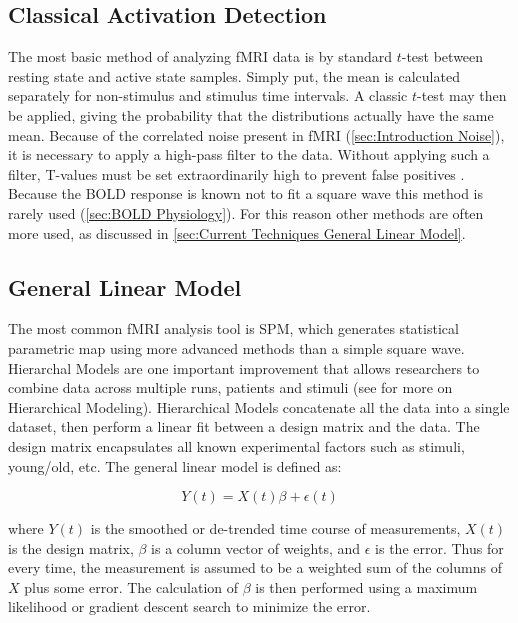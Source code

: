 \subsection{Classical Activation Detection}
\label{sec:Square Wave}
The most basic method of analyzing \ac{fMRI} data is by standard $t$-test
between resting state and active state samples. Simply put, the
mean is calculated separately for non-stimulus and stimulus time intervals.
A classic $t$-test may then be applied, giving the probability that the
distributions actually have the same mean. Because of the correlated
noise present in \ac{fMRI} (\autoref{sec:Introduction Noise}), it is necessary
to apply a high-pass filter to the data. Without applying
such a filter, T-values must be set extraordinarily high to prevent
false positives \cite{Smith2007}. Because the \ac{BOLD} response is known
not to fit a square wave this method is rarely used
(\autoref{sec:BOLD Physiology}). For this reason other methods
are often more used, as discussed in 
\autoref{sec:Current Techniques General Linear Model}.

\subsection{General Linear Model}
\label{sec:Current Techniques General Linear Model}
The most common \ac{fMRI} analysis tool is \ac{SPM}, which generates
statistical parametric map using more advanced methods than a simple
square wave. Hierarchal
Models are one important improvement that allows researchers
to combine data across multiple runs, patients and stimuli
(see \cite{Hofmann1997} for more on Hierarchical Modeling). 
Hierarchical Models
concatenate all the data into a single dataset, then perform
a linear fit between a design matrix and the data. The design matrix
encapsulates all known experimental factors such as stimuli,
young/old, etc.  The general linear model is defined as:

\begin{equation}
Y(t) = X(t)\beta + \epsilon(t)
\end{equation}

where $Y(t)$ is the smoothed or de-trended time course of measurements,
$X(t)$ is the design matrix, $\beta$ is a column vector of weights,
and $\epsilon$ is the error. Thus for every time, the measurement is
assumed to be a weighted sum of the columns of $X$ plus some error. The calculation
of $\beta$ is then performed using a maximum likelihood or gradient descent search 
to minimize the error. 

